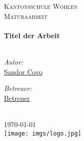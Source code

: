 \begin{titlepage}
\begin{center}

\textsc{\LARGE Kantonsschule Wohlen}\\[1.5cm] %
\textsc{\Large Maturaarbeit}\\[0.5cm] %

\HRule \\[0.4cm] %
{\huge \bfseries Titel der Arbeit}\\[0.4cm] %
\HRule \\[1.5cm] %
 
\begin{minipage}{0.4\textwidth}
\begin{flushleft} \large
\emph{Autor:}\\
\href{http://www.covo.ch}{Sandor Covo} %
\end{flushleft}
\end{minipage}
\begin{minipage}{0.4\textwidth}
\begin{flushright} \large
\emph{Betreuer:} \\
\href{http://www.jamessmith.com}{Betreuer} %
\end{flushright}
\end{minipage}\\[3cm]
 
{\large \today}\\[4cm] %
\texttt{[image: imgs/logo.jpg]} %
 
\vfill
\end{center}

\end{titlepage}
